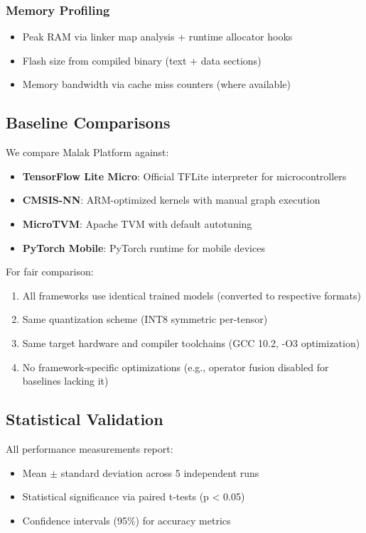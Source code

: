 \subsubsection{Memory Profiling}
\begin{itemize}
\item Peak RAM via linker map analysis + runtime allocator hooks
\item Flash size from compiled binary (text + data sections)
\item Memory bandwidth via cache miss counters (where available)
\end{itemize}

\subsection{Baseline Comparisons}

We compare Malak Platform against:
\begin{itemize}
\item \textbf{TensorFlow Lite Micro}: Official TFLite interpreter for microcontrollers
\item \textbf{CMSIS-NN}: ARM-optimized kernels with manual graph execution
\item \textbf{MicroTVM}: Apache TVM with default autotuning
\item \textbf{PyTorch Mobile}: PyTorch runtime for mobile devices
\end{itemize}

For fair comparison:
\begin{enumerate}
\item All frameworks use identical trained models (converted to respective formats)
\item Same quantization scheme (INT8 symmetric per-tensor)
\item Same target hardware and compiler toolchains (GCC 10.2, -O3 optimization)
\item No framework-specific optimizations (e.g., operator fusion disabled for baselines lacking it)
\end{enumerate}

\subsection{Statistical Validation}

All performance measurements report:
\begin{itemize}
\item Mean $\pm$ standard deviation across 5 independent runs
\item Statistical significance via paired t-tests (p < 0.05)
\item Confidence intervals (95\%) for accuracy metrics
\end{itemize}

